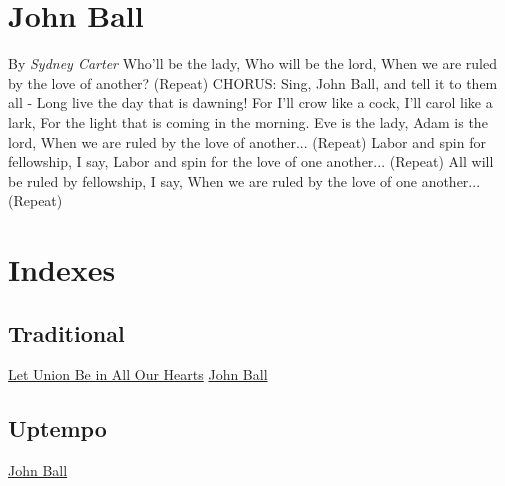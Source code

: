 \documentclass{book}%
\begin{document}
\chapter{John Ball}%
\label{johnball}%
By %
\textit{Sydney Carter}%
\newline%
Who’ll be the lady,\newline%
Who will be the lord,\newline%
When we are ruled by the love of another?\newline%
(Repeat)\newline%
\newline%
CHORUS:\newline%
Sing, John Ball, and tell it to them all {-}\newline%
Long live the day that is dawning!\newline%
For I'll crow like a cock,\newline%
I'll carol like a lark,\newline%
For the light that is coming in the morning.\newline%
\newline%
Eve is the lady, Adam is the lord,\newline%
When we are ruled by the love of another...\newline%
(Repeat)\newline%
\newline%
Labor and spin for fellowship, I say,\newline%
Labor and spin for the love of one another...\newline%
(Repeat)\newline%
\newline%
All will be ruled by fellowship, I say,\newline%
When we are ruled by the love of one another...\newline%
(Repeat)\newline%
\newline%
%
\chapter{Indexes}%
\section{Traditional}%
\hyperref[letunionbeinallourhearts]{Let Union Be in All Our Hearts}%
\hyperref[johnball]{John Ball}

%
\section{Uptempo}%
\hyperref[johnball]{John Ball}

%
\end{document}

